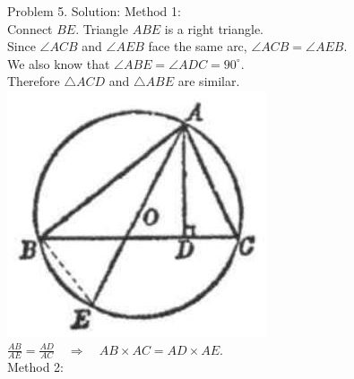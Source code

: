 \documentclass[10pt]{article}
\begin{document}
Problem 5. Solution:
Method 1:\\
Connect \(B E\). Triangle \(A B E\) is a right triangle.\\
Since \(\angle A C B\) and \(\angle A E B\) face the same arc, \(\angle A C B=\angle A E B\).\\
We also know that \(\angle A B E=\angle A D C=90^{\circ}\).\\
Therefore \(\triangle A C D\) and \(\triangle A B E\) are similar.\\
\includegraphics[max width=\textwidth, center]{2025_04_17_97bc1f7e44d93c271a88g-172(1)}\\
\(\frac{A B}{A E}=\frac{A D}{A C} \quad \Rightarrow \quad A B \times A C=A D \times A E\).\\
Method 2:
\end{document}
